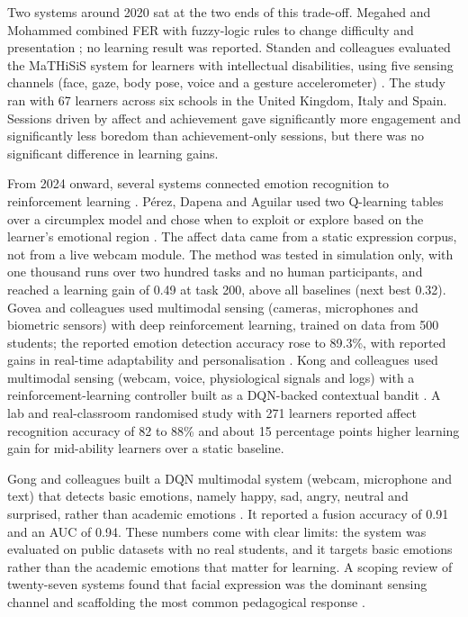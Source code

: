 Two systems around 2020 sat at the two ends of this trade-off. Megahed and Mohammed combined \ac{FER} with fuzzy-logic rules to change difficulty and presentation \cite{megahed_modeling_2020}; no learning result was reported. Standen and colleagues evaluated the MaTHiSiS system for learners with intellectual disabilities, using five sensing channels (face, gaze, body pose, voice and a gesture accelerometer) \cite{standen_evaluation_2020}. The study ran with 67 learners across six schools in the United Kingdom, Italy and Spain. Sessions driven by affect and achievement gave significantly more engagement and significantly less boredom than achievement-only sessions, but there was no significant difference in learning gains.

From 2024 onward, several systems connected emotion recognition to reinforcement learning \cite{perez_emotions_2024,govea_implementation_2024,gong_design_2025,kong_real-time_2025}. Pérez, Dapena and Aguilar used two Q-learning tables over a circumplex model and chose when to exploit or explore based on the learner's emotional region \cite{perez_emotions_2024}. The affect data came from a static expression corpus, not from a live webcam module. The method was tested in simulation only, with one thousand runs over two hundred tasks and no human participants, and reached a learning gain of 0.49 at task 200, above all baselines (next best 0.32). Govea and colleagues used multimodal sensing (cameras, microphones and biometric sensors) with deep reinforcement learning, trained on data from 500 students; the reported emotion detection accuracy rose to 89.3\%, with reported gains in real-time adaptability and personalisation \cite{govea_implementation_2024}. Kong and colleagues used multimodal sensing (webcam, voice, physiological signals and logs) with a reinforcement-learning controller built as a \ac{DQN}-backed contextual bandit \cite{kong_real-time_2025}. A lab and real-classroom randomised study with 271 learners reported affect recognition accuracy of 82 to 88\% and about 15 percentage points higher learning gain for mid-ability learners over a static baseline.

Gong and colleagues built a \ac{DQN} multimodal system (webcam, microphone and text) that detects basic emotions, namely happy, sad, angry, neutral and surprised, rather than academic emotions \cite{gong_design_2025}. It reported a fusion accuracy of 0.91 and an AUC of 0.94. These numbers come with clear limits: the system was evaluated on public datasets with no real students, and it targets basic emotions rather than the academic emotions that matter for learning. A scoping review of twenty-seven systems found that facial expression was the dominant sensing channel and scaffolding the most common pedagogical response \cite{fernandez-herrero_evaluating_2024}.

